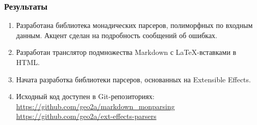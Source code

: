 \documentclass[12pt, compress, t]{beamer}
\begin{document}
\begin{frame}[fragile]
  \frametitle{Результаты}
  \begin{enumerate}
    \item Разработана библиотека монадических парсеров, полиморфных по входным данным. Акцент сделан на подробность сообщений об ошибках. 
    \item Разработан транслятор подмножества Markdown с \LaTeX-вставками в HTML.
    \item Начата разработка библиотеки парсеров, основанных на Extensible Effects.
    \item Исходный код доступен в Git-репозиториях: \\
        \small{\url{https://github.com/geo2a/markdown_monparsing}} \\
        \small{\url{https://github.com/geo2a/ext-effects-parsers}}
  \end{enumerate}
\end{frame}
\end{document}
